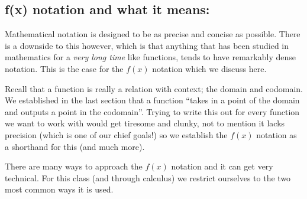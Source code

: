 \documentclass{ximera}
\begin{document}


\subsection*{\textbf{f(x) notation and what it means:}}

    Mathematical notation is designed to be as precise and concise as possible. There is a downside to this however, which is that anything that has been studied in mathematics for a \textit{very long time} like functions, tends to have remarkably dense notation. This is the case for the $f(x)$ notation which we discuss here.
    
    Recall that a function is really a relation with context; the domain and codomain. We established in the last section that a function ``takes in a point of the domain and outputs a point in the codomain''. Trying to write this out for every function we want to work with would get tiresome and clunky, not to mention it lacks precision (which is one of our chief goals!) so we establish the $f(x)$ notation as a shorthand for this (and much more).
    
    There are many ways to approach the $f(x)$ notation and it can get very technical. For this class (and through calculus) we restrict ourselves to the two most common ways it is used.
    
\end{document}
